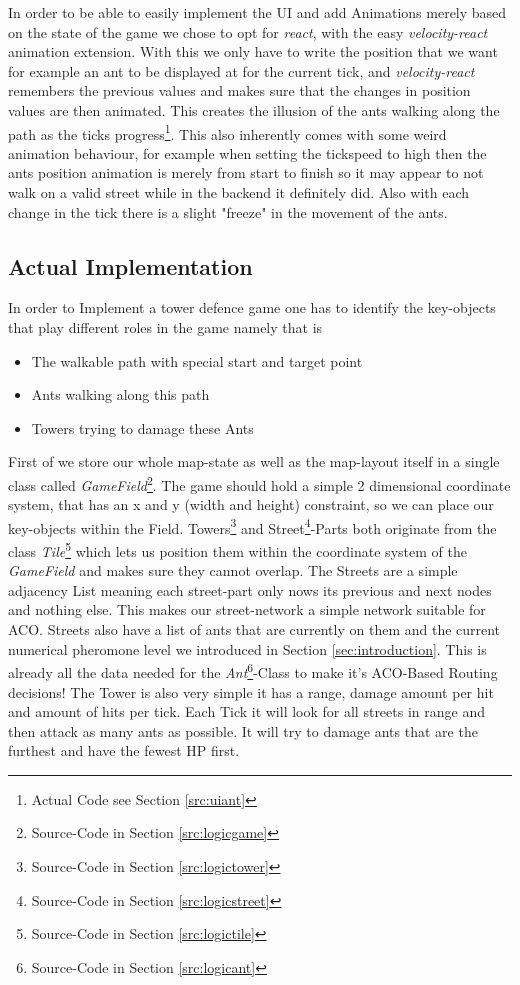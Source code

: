 In order to be able to easily implement the UI and add Animations merely based on the state of the game we chose to opt for \textit{react}\cite{libsreact}, with the easy \textit{velocity-react}\cite{libsreactvelocity} animation extension. With this we only have to write the position that we want for example an ant to be displayed at for the current tick, and \textit{velocity-react} remembers the previous values and makes sure that the changes in position values are then animated. This creates the illusion of the ants walking along the path as the ticks progress\footnote{Actual Code see Section \ref{src:uiant}}. This also inherently comes with some weird animation behaviour, for example when setting the tickspeed to high then the ants position animation is merely from start to finish so it may appear to not walk on a valid street while in the backend it definitely did. Also with each change in the tick there is a slight "freeze" in the movement of the ants.

\subsection{Actual Implementation}
\label{sec:implementationactual}

In order to Implement a tower defence game one has to identify the key-objects that play different roles in the game namely that is
\begin{itemize}
\item The walkable path with special start and target point
\item Ants walking along this path
\item Towers trying to damage these Ants
\end{itemize}
First of we store our whole map-state as well as the map-layout itself in a single class called \textit{GameField}\footnote{Source-Code in Section \ref{src:logicgame}}. The game should hold a simple 2 dimensional coordinate system, that has an x and y (width and height) constraint, so we can place our key-objects within the Field. Towers\footnote{Source-Code in Section \ref{src:logictower}} and Street\footnote{Source-Code in Section \ref{src:logicstreet}}-Parts both originate from the class \textit{Tile}\footnote{Source-Code in Section \ref{src:logictile}} which lets us position them within the coordinate system of the \textit{GameField} and makes sure they cannot overlap.
The Streets are a simple adjacency List meaning each street-part only nows its previous and next nodes and nothing else. This makes our street-network a simple network suitable for ACO. Streets also have a list of ants that are currently on them and the current numerical pheromone level we introduced in Section \ref{sec:introduction}. This is already all the data needed for the \textit{Ant}\footnote{Source-Code in Section \ref{src:logicant}}-Class to make it's ACO-Based Routing decisions!
The Tower is also very simple it has a range, damage amount per hit and amount of hits per tick. Each Tick it will look for all streets in range and then attack as many ants as possible. It will try to damage ants that are the furthest and have the fewest HP first.

